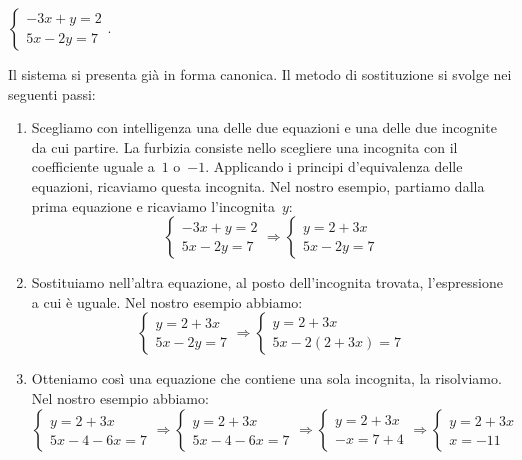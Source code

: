 \begin{exrig}
\begin{esempio}
$\left\{\begin{array}{l}-3x+y=2\\5x-2y=7\end{array}\right.$.
\end{esempio}

Il sistema si presenta già in forma canonica. Il metodo di
sostituzione si svolge nei seguenti passi:

\begin{enumerate}
 \item Scegliamo con intelligenza una delle due equazioni e una
delle due incognite da cui partire. 
La furbizia consiste nello scegliere una incognita con il coefficiente uguale 
a~$1$ o~$-1$.
Applicando i principi d'equivalenza delle equazioni, ricaviamo questa
incognita.
Nel nostro esempio, partiamo dalla prima equazione e ricaviamo
l'incognita~$y$:
\[\left\{\begin{array}{l}
     -3x+y=2\\
     5x-2y=7
    \end{array}
\right.
\Rightarrow
\left\{\begin{array}{l}y=2+3x \\
         5x-2y=7
\end{array}\right.\]

 \item Sostituiamo nell'altra equazione, al posto
dell'incognita trovata, l'espressione a cui è uguale. 
Nel nostro esempio abbiamo:
\[\left\{\begin{array}{l}
     y=2+3x\\
     5x-2y=7
    \end{array}
\right.
\Rightarrow
\left\{\begin{array}{l}y=2+3x \\
         5x-2(2+3x)=7
\end{array}\right.\]

 \item Otteniamo così una equazione che contiene una sola 
incognita, la risolviamo.
Nel nostro esempio abbiamo:
\[\left\{\begin{array}{l}y=2+3x\\
5x-4-6x=7\end{array}\right.\Rightarrow
\left\{\begin{array}{l}
         y=2+3x\\
         5x-4-6x=7
        \end{array}\right.\Rightarrow
 \left\{\begin{array}{l}y=2+3x\\
         -x=7+4
        \end{array}\right.\Rightarrow
 \left\{\begin{array}{l}y=2+3x\\
         x=-11
  \end{array}\right.\]


\end{enumerate}
\end{exrig}
